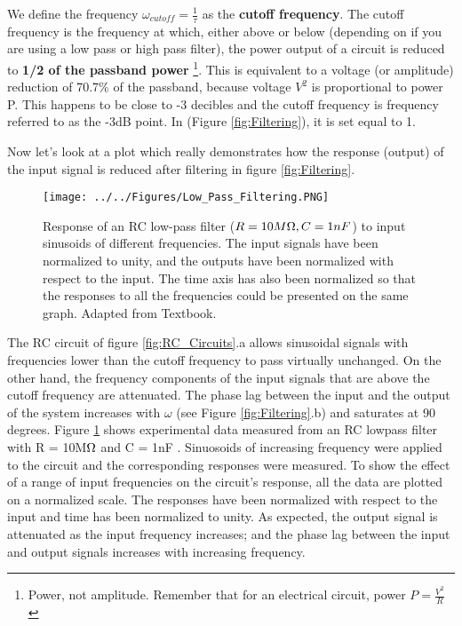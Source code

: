 We define the frequency $\omega_{cutoff} = \frac{1}{\tau}$ as the \textbf{cutoff frequency}.  The cutoff frequency is the frequency at which, either above or below (depending on if you are using a low pass or high pass filter), the power output of a circuit is reduced to \textbf{1/2 of the passband power} \footnote{Power, not amplitude. Remember that for an electrical circuit, power $P = \frac{V^2}{R}$}. This is equivalent to a voltage (or amplitude) reduction of 70.7\% of the passband, because voltage $V^2$ is proportional to power P. This happens to be close to -3 decibles and the cutoff frequency is frequency referred to as the -3dB point. In (Figure \ref{fig:Filtering}), it is set equal to 1.

Now let's look at a plot which really demonstrates how the response (output) of the input signal is reduced after filtering in figure \ref{fig:Filtering}. 

\begin{figure}[H]
    \centering
    \texttt{[image: ../../Figures/Low\_Pass\_Filtering.PNG]}
    \caption{Response of an RC low-pass filter ($R = 10M\ohm, C = 1nF$) to input sinusoids of different frequencies. The input signals have been normalized to unity, and the outputs have been normalized with respect to the input. The time axis has also been normalized so that the responses to all the frequencies could be presented on the same graph. Adapted from Textbook.}
    \label{fig:Filtering_2}
\end{figure}


The RC circuit of figure \ref{fig:RC_Circuits}.a allows sinusoidal
signals with frequencies lower than the cutoff frequency to pass virtually
unchanged. On the other hand, the frequency components of the input signals
that are above the cutoff frequency are attenuated. The phase lag between the
input and the output of the system increases with $\omega$ (see Figure \ref{fig:Filtering}.b) and saturates at 90 degrees. Figure \ref{fig:Filtering_2} shows experimental data measured from an RC lowpass filter with R = 10M$\ohm$ and C = 1nF . Sinuosoids of increasing
frequency were applied to the circuit and the corresponding responses were
measured. To show the effect of a range of input frequencies on the circuit’s
response, all the data are plotted on a normalized scale. The responses have
been normalized with respect to the input and time has been normalized to
unity. As expected, the output signal is attenuated as the input frequency
increases; and the phase lag between the input and output signals increases
with increasing frequency.

